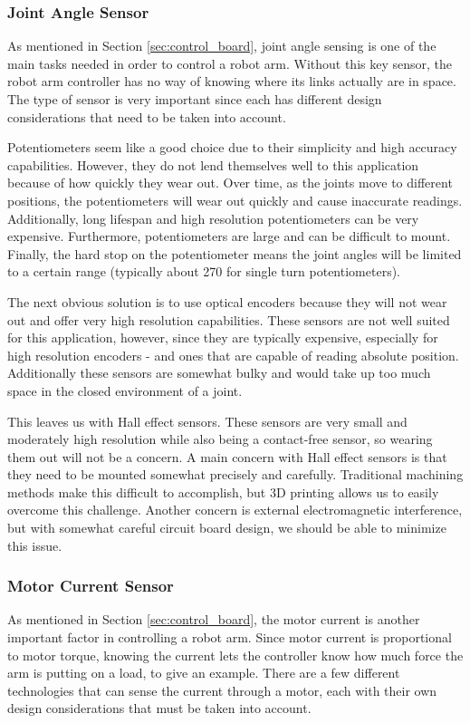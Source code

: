 \subsubsection{Joint Angle Sensor}
\label{sec:jas}
As mentioned in Section \ref{sec:control_board}, joint angle sensing is one of the main tasks needed in order to control a robot arm. Without this key sensor, the robot arm controller has no way of knowing where its links actually are in space. The type of sensor is very important since each has different design considerations that need to be taken into account.

\noindent Potentiometers seem like a good choice due to their simplicity and high accuracy capabilities. However, they do not lend themselves well to this application because of how quickly they wear out. Over time, as the joints move to different positions, the potentiometers will wear out quickly and cause inaccurate readings. Additionally, long lifespan and high resolution potentiometers can be very expensive. Furthermore, potentiometers are large and can be difficult to mount. Finally, the hard stop on the potentiometer means the joint angles will be limited to a certain range (typically about 270 \textdegree for single turn potentiometers).

\noindent The next obvious solution is to use optical encoders because they will not wear out and offer very high resolution capabilities. These sensors are not well suited for this application, however, since they are typically expensive, especially for high resolution encoders - and ones that are capable of reading absolute position. Additionally these sensors are somewhat bulky and would take up too much space in the closed environment of a joint. 

\noindent This leaves us with Hall effect sensors. These sensors are very small and moderately high resolution while also being a contact-free sensor, so wearing them out will not be a concern. A main concern with Hall effect sensors is that they need to be mounted somewhat precisely and carefully. Traditional machining methods make this difficult to accomplish, but 3D printing allows us to easily overcome this challenge.  Another concern is external electromagnetic interference, but with somewhat careful circuit board design, we should be able to minimize this issue.

\subsubsection{Motor Current Sensor}
As mentioned in Section \ref{sec:control_board}, the motor current is another important factor in controlling a robot arm. Since motor current is proportional to motor torque, knowing the current lets the controller know how much force the arm is putting on a load, to give an example. There are a few different technologies that can sense the current through a motor, each with their own design considerations that must be taken into account.

